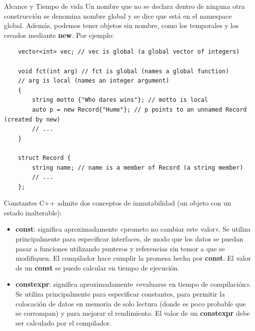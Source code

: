 \documentclass[11pt]{beamer}
\begin{document}
	\begin{frame}[fragile]{Alcance y Tiempo de vida}
		\small
	Un nombre que no se declara dentro de ninguna otra construcción se denomina nombre global y se dice que está en el namespace global.
	Además, podemos tener objetos sin nombre, como los temporales y los creados mediante \textbf{new}. Por ejemplo:\\
	\vspace{0.5cm}
	
	\begin{lstlisting}
	vector<int> vec; // vec is global (a global vector of integers)
	
	void fct(int arg) // fct is global (names a global function)
	// arg is local (names an integer argument)
	{
		string motto {"Who dares wins"}; // motto is local
		auto p = new Record{"Hume"}; // p points to an unnamed Record (created by new)
		// ...
	}
	
	struct Record {
		string name; // name is a member of Record (a string member)
		// ...
	};
	\end{lstlisting}
	\end{frame}

	\begin{frame}{Constantes}
		\small
	C++ admite dos conceptos de inmutabilidad (un objeto con un estado inalterable):
	\begin{itemize}
		\item \textbf{const}: significa aproximadamente «prometo no cambiar este valor». Se utiliza principalmente para especificar interfaces, de modo que los datos se puedan pasar a funciones utilizando punteros y referencias sin temor a que se modifiquen. El compilador hace cumplir la promesa hecha por \textbf{const}. El valor de un \textbf{const} se puede calcular en tiempo de ejecución.
		\item \textbf{constexpr}: significa aproximadamente «evaluarse en tiempo de compilación». Se utiliza principalmente para especificar constantes, para permitir la colocación de datos en memoria de solo lectura (donde es poco probable que se corrompan) y para mejorar el rendimiento. El valor de un \textbf{constexpr} debe ser calculado por el compilador.
	\end{itemize}
	 

	\end{frame}
	
\end{document}
